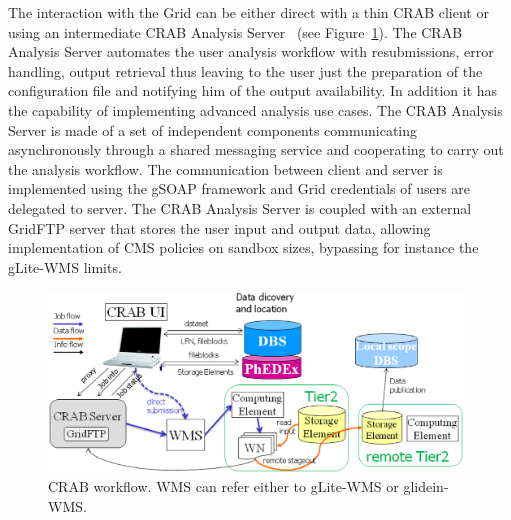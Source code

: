 The interaction with the Grid can be either direct with a thin CRAB client or using an intermediate CRAB Analysis Server~\cite{RefCRAB} (see Figure~\ref{fig:CRABWorkflow}). The CRAB Analysis Server automates the user analysis workflow with resubmissions, error handling, output retrieval thus leaving to the user just the preparation of the configuration file and notifying him of the output availability. In addition it has the capability of implementing advanced analysis use cases.
The CRAB Analysis Server is made of a set of independent components communicating asynchronously through a shared messaging service and cooperating to carry out the analysis workflow. The communication between client and server is implemented using the gSOAP framework and Grid credentials of users are delegated to server.
The CRAB Analysis Server is coupled with an external GridFTP server %
 that stores the user input and output data, allowing implementation of CMS policies on sandbox sizes, bypassing for instance the gLite-WMS limits.


\begin{figure}
 \includegraphics[width=0.98\textwidth]{CRABWorkflow.eps}
\caption{CRAB workflow. WMS can refer either to gLite-WMS or glidein-WMS.}
\label{fig:CRABWorkflow}
\end{figure}

